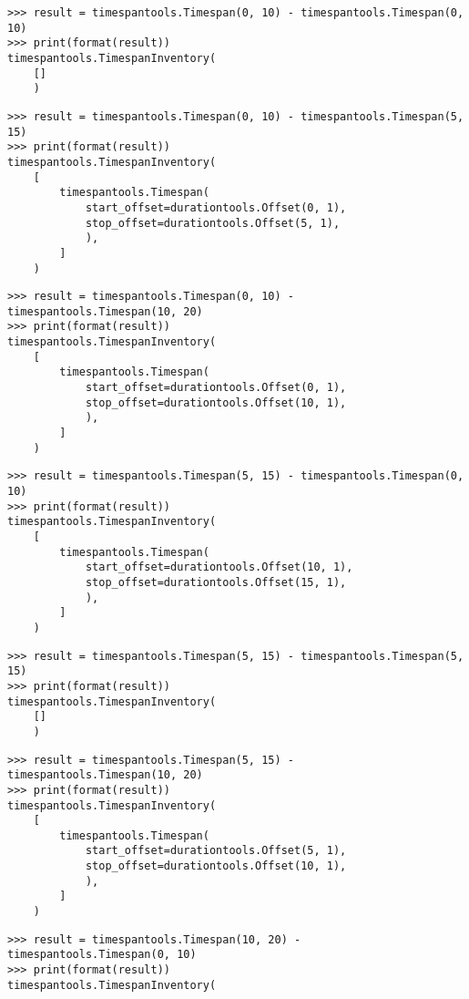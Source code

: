 \begin{abjadbookoutput}
\begin{singlespacing}
\vspace{-0.5\baselineskip}
\begin{verbatim}
>>> result = timespantools.Timespan(0, 10) - timespantools.Timespan(0, 10)
>>> print(format(result))
timespantools.TimespanInventory(
    []
    )
\end{verbatim}
\begin{verbatim}
>>> result = timespantools.Timespan(0, 10) - timespantools.Timespan(5, 15)
>>> print(format(result))
timespantools.TimespanInventory(
    [
        timespantools.Timespan(
            start_offset=durationtools.Offset(0, 1),
            stop_offset=durationtools.Offset(5, 1),
            ),
        ]
    )
\end{verbatim}
\begin{verbatim}
>>> result = timespantools.Timespan(0, 10) - timespantools.Timespan(10, 20)
>>> print(format(result))
timespantools.TimespanInventory(
    [
        timespantools.Timespan(
            start_offset=durationtools.Offset(0, 1),
            stop_offset=durationtools.Offset(10, 1),
            ),
        ]
    )
\end{verbatim}
\begin{verbatim}
>>> result = timespantools.Timespan(5, 15) - timespantools.Timespan(0, 10)
>>> print(format(result))
timespantools.TimespanInventory(
    [
        timespantools.Timespan(
            start_offset=durationtools.Offset(10, 1),
            stop_offset=durationtools.Offset(15, 1),
            ),
        ]
    )
\end{verbatim}
\begin{verbatim}
>>> result = timespantools.Timespan(5, 15) - timespantools.Timespan(5, 15)
>>> print(format(result))
timespantools.TimespanInventory(
    []
    )
\end{verbatim}
\begin{verbatim}
>>> result = timespantools.Timespan(5, 15) - timespantools.Timespan(10, 20)
>>> print(format(result))
timespantools.TimespanInventory(
    [
        timespantools.Timespan(
            start_offset=durationtools.Offset(5, 1),
            stop_offset=durationtools.Offset(10, 1),
            ),
        ]
    )
\end{verbatim}
\begin{verbatim}
>>> result = timespantools.Timespan(10, 20) - timespantools.Timespan(0, 10)
>>> print(format(result))
timespantools.TimespanInventory(

\end{verbatim}
\end{singlespacing}
\end{abjadbookoutput}
